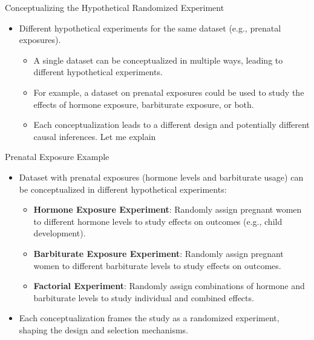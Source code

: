 \documentclass{beamer}
\begin{document}
\begin{frame}{Conceptualizing the Hypothetical Randomized Experiment}
  \begin{itemize}

    \item Different hypothetical experiments for the same dataset (e.g., prenatal exposures).
    	\begin{itemize}
	\item A single dataset can be conceptualized in multiple ways, leading to different hypothetical experiments. 
	\item For example, a dataset on prenatal exposures could be used to study the effects of hormone exposure, barbiturate exposure, or both. 
	\item Each conceptualization leads to a different design and potentially different causal inferences. Let me explain
	\end{itemize}
\end{itemize}

\end{frame}

\begin{frame}{Prenatal Exposure Example}

\begin{itemize}

\item Dataset with prenatal exposures (hormone levels and barbiturate usage) can be conceptualized in different hypothetical experiments:
	\begin{itemize}
	\item \textbf{Hormone Exposure Experiment}: Randomly assign pregnant women to different hormone levels to study effects on outcomes (e.g., child development).
	\item \textbf{Barbiturate Exposure Experiment}: Randomly assign pregnant women to different barbiturate levels to study effects on outcomes.
	\item \textbf{Factorial Experiment}: Randomly assign combinations of hormone and barbiturate levels to study individual and combined effects.
	\end{itemize}
\item Each conceptualization frames the study as a randomized experiment, shaping the design and selection mechanisms.

\end{itemize}

\end{frame}
\end{document}
